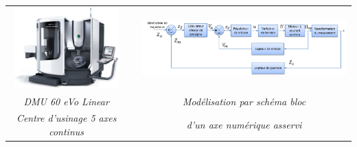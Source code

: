\documentclass[10pt,fleqn]{article} %
\def\xxactivite{Cours}
\def\xxauteur{\textsl{Xavier Pessoles}}
\def\xxpied{%
Partie 2 -- Découverte des SLCI\\
Ch. 6 : Étude des performances des systèmes complexes -- \xxactivite%
}
\begin{document}




%
%
%
%
%
%
%
%
%
%
%
%
%
%
%
%
%
%
%
%
%
%
%
%

\begin{center}
\begin{tabular}{ccc}
\includegraphics[width=4cm]{images/dmg} &&
\includegraphics[width=10cm]{images/schemabloc}\\
\textit{DMU 60 eVo Linear} &&
\textit{Modélisation par schéma bloc}\\
\textit{Centre d'usinage 5 axes continus\cite{cite1}} && 
\textit{d'un axe numérique asservi \cite{cite2}}\\
\end{tabular}
\end{center}
\end{document}
